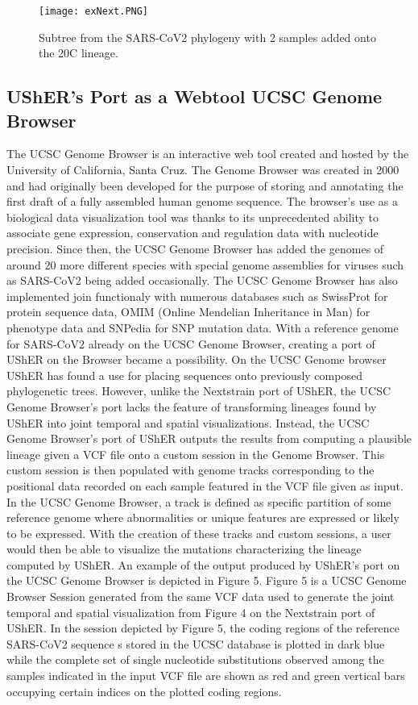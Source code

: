 \documentclass[12pt,journal,compsoc]{IEEEtran}
\begin{document}
\begin{figure}[H]
    \centering
    \texttt{[image: exNext.PNG]}
    \caption{ 
    Subtree from the SARS-CoV2 phylogeny with 2 samples added onto the 20C lineage\cite{binf:ox}.}
\end{figure}

\subsection{UShER's Port as a Webtool UCSC Genome Browser}
The UCSC Genome Browser is an interactive web tool created and hosted by the University of California, Santa Cruz. The Genome Browser was created in 2000 and had originally been developed for the purpose of storing and annotating the first draft of a fully assembled human genome sequence. The browser's use as a biological data visualization tool was thanks to its unprecedented ability to associate gene expression, conservation and regulation data with nucleotide precision. Since then, the UCSC Genome Browser has added the genomes of around 20 more different species with special genome assemblies for viruses such as SARS-CoV2 being added occasionally. The UCSC Genome Browser has also implemented join functionaly with numerous databases such as SwissProt for protein sequence data, OMIM (Online Mendelian Inheritance in Man) for phenotype data and SNPedia for SNP mutation data. With a reference genome for SARS-CoV2 already on the UCSC Genome Browser, creating a port of UShER on the Browser became a possibility. On the UCSC Genome browser UShER has found a use for placing sequences onto previously composed phylogenetic trees. However, unlike the Nextstrain port of UShER, the UCSC Genome Browser’s port lacks the feature of transforming lineages found by UShER into joint temporal and spatial visualizations. Instead, the UCSC Genome Browser’s port of UShER outputs the results from computing a plausible lineage given a VCF file onto a custom session in the Genome Browser. This custom session is then populated with genome tracks corresponding to the positional data recorded on each sample featured in the VCF file given as input. In the UCSC Genome Browser, a track is defined as specific partition of some reference genome where abnormalities or unique features are expressed or likely to be expressed. With the creation of these tracks and custom sessions, a user would then be able to visualize the mutations characterizing the lineage computed by UShER. An example of the output produced by UShER’s port on the UCSC Genome Browser is depicted in Figure 5. Figure 5 is a UCSC Genome Browser Session generated from the same VCF data used to generate the joint temporal and spatial visualization from Figure 4 on the Nextstrain port of UShER. In the session depicted by Figure 5, the coding regions of the reference SARS-CoV2 sequence s stored in the UCSC database is plotted in dark blue while the complete set of single nucleotide substitutions observed among the samples indicated in the input VCF file are shown as red and green vertical bars occupying certain indices on the plotted coding regions. 
\end{document}
